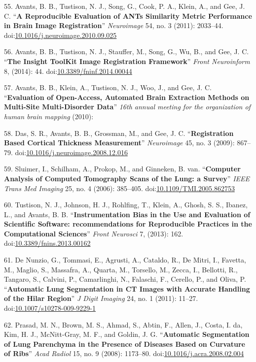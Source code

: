 \documentclass[11pt,]{article}
\begin{document}
55. Avants, B. B., Tustison, N. J., Song, G., Cook, P. A., Klein, A.,
and Gee, J. C. ``\textbf{A Reproducible Evaluation of ANTs Similarity
Metric Performance in Brain Image Registration}'' \emph{Neuroimage} 54,
no. 3 (2011): 2033--44.
doi:\href{http://dx.doi.org/10.1016/j.neuroimage.2010.09.025}{10.1016/j.neuroimage.2010.09.025}

56. Avants, B. B., Tustison, N. J., Stauffer, M., Song, G., Wu, B., and
Gee, J. C. ``\textbf{The Insight ToolKit Image Registration Framework}''
\emph{Front Neuroinform} 8, (2014): 44.
doi:\href{http://dx.doi.org/10.3389/fninf.2014.00044}{10.3389/fninf.2014.00044}

57. Avants, B. B., Klein, A., Tustison, N. J., Woo, J., and Gee, J. C.
``\textbf{Evaluation of Open-Access, Automated Brain Extraction Methods
on Multi-Site Multi-Disorder Data}'' \emph{16th annual meeting for the
organization of human brain mapping} (2010):

58. Das, S. R., Avants, B. B., Grossman, M., and Gee, J. C.
``\textbf{Registration Based Cortical Thickness Measurement}''
\emph{Neuroimage} 45, no. 3 (2009): 867--79.
doi:\href{http://dx.doi.org/10.1016/j.neuroimage.2008.12.016}{10.1016/j.neuroimage.2008.12.016}

59. Sluimer, I., Schilham, A., Prokop, M., and Ginneken, B. van.
``\textbf{Computer Analysis of Computed Tomography Scans of the Lung: a
Survey}'' \emph{IEEE Trans Med Imaging} 25, no. 4 (2006): 385--405.
doi:\href{http://dx.doi.org/10.1109/TMI.2005.862753}{10.1109/TMI.2005.862753}

60. Tustison, N. J., Johnson, H. J., Rohlfing, T., Klein, A., Ghosh, S.
S., Ibanez, L., and Avants, B. B. ``\textbf{Instrumentation Bias in the
Use and Evaluation of Scientific Software: recommendations for
Reproducible Practices in the Computational Sciences}'' \emph{Front
Neurosci} 7, (2013): 162.
doi:\href{http://dx.doi.org/10.3389/fnins.2013.00162}{10.3389/fnins.2013.00162}

61. De Nunzio, G., Tommasi, E., Agrusti, A., Cataldo, R., De Mitri, I.,
Favetta, M., Maglio, S., Massafra, A., Quarta, M., Torsello, M., Zecca,
I., Bellotti, R., Tangaro, S., Calvini, P., Camarlinghi, N., Falaschi,
F., Cerello, P., and Oliva, P. ``\textbf{Automatic Lung Segmentation in
CT Images with Accurate Handling of the Hilar Region}'' \emph{J Digit
Imaging} 24, no. 1 (2011): 11--27.
doi:\href{http://dx.doi.org/10.1007/s10278-009-9229-1}{10.1007/s10278-009-9229-1}

62. Prasad, M. N., Brown, M. S., Ahmad, S., Abtin, F., Allen, J., Costa,
I. da, Kim, H. J., McNitt-Gray, M. F., and Goldin, J. G.
``\textbf{Automatic Segmentation of Lung Parenchyma in the Presence of
Diseases Based on Curvature of Ribs}'' \emph{Acad Radiol} 15, no. 9
(2008): 1173--80.
doi:\href{http://dx.doi.org/10.1016/j.acra.2008.02.004}{10.1016/j.acra.2008.02.004}
\end{document}
